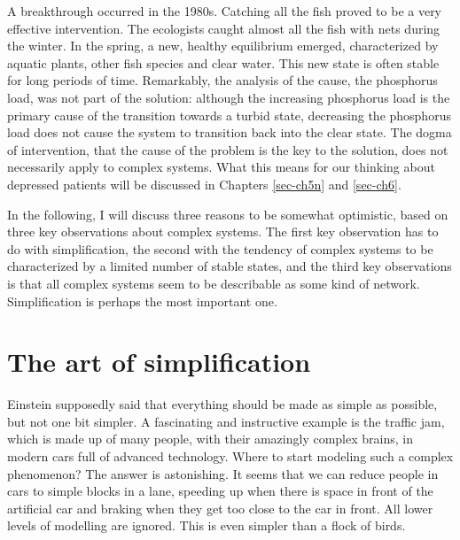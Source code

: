 \documentclass[
  a4paper,
  DIV=11,
  numbers=noendperiod,
  oneside]{scrreprt}
\begin{document}
A breakthrough occurred in the 1980s. Catching all the fish proved to be
a very effective intervention. The ecologists caught almost all the fish
with nets during the winter. In the spring, a new, healthy equilibrium
emerged, characterized by aquatic plants, other fish species and clear
water. This new state is often stable for long periods of time.
Remarkably, the analysis of the cause, the phosphorus load, was not part
of the solution: although the increasing phosphorus load is the primary
cause of the transition towards a turbid state, decreasing the
phosphorus load does not cause the system to transition back into the
clear state. The dogma of intervention, that the cause of the problem is
the key to the solution, does not necessarily apply to complex systems.
What this means for our thinking about depressed patients will be
discussed in Chapters \ref{sec-ch5n} and \ref{sec-ch6}.

In the following, I will discuss three reasons to be somewhat
optimistic, based on three key observations about complex systems. The
first key observation has to do with simplification, the second with the
tendency of complex systems to be characterized by a limited number of
stable states, and the third key observations is that all complex
systems seem to be describable as some kind of network. Simplification
is perhaps the most important one.

\hypertarget{sec-The-art-of-simplification}{%
\section{The art of
simplification}\label{sec-The-art-of-simplification}}

Einstein supposedly said that everything should be made as simple as
possible, but not one bit simpler. A fascinating and instructive example
is the traffic jam, which is made up of many people, with their
amazingly complex brains, in modern cars full of advanced technology.
Where to start modeling such a complex phenomenon? The answer is
astonishing. It seems that we can reduce people in cars to simple blocks
in a lane, speeding up when there is space in front of the artificial
car and braking when they get too close to the car in front. All lower
levels of modelling are ignored. This is even simpler than a flock of
birds.
\end{document}

